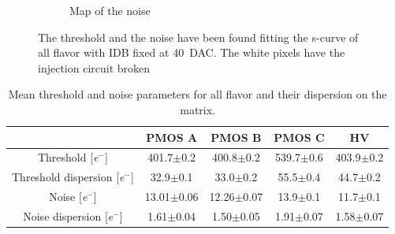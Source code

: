 \begin{figure}
\begin{subfigure}[b]{0.49\textwidth}
                \caption{Map of the noise}
                \label{fig:noise_map}
            \end{subfigure}
            \caption{The threshold and the noise have been found fitting the s-curve of all flavor with IDB fixed at \SI{40}{DAC}. The white pixels have the injection circuit broken}
               \label{fig:threshold_noise_hist}
       \end{figure}
             

        \begin{table}[h!]
            \begin{center}
            \begin{tabular}{| c |  c | c | c |c |}
            \hline
            & PMOS A & PMOS B & PMOS C & HV \\
            \hline
            \hline
            Threshold [\si{\elementarycharge}$^-$] & 401.7$\pm$0.2 & 400.8$\pm$0.2 & 539.7$\pm$0.6 &  403.9$\pm$0.2\\
            Threshold dispersion [\si{\elementarycharge}$^-$] & 32.9$\pm$0.1 & 33.0$\pm$0.2 & 55.5$\pm$0.4 & 44.7$\pm$0.2\\
            Noise [\si{\elementarycharge}$^-$] & 13.01$\pm$0.06 & 12.26$\pm$0.07 & 13.9$\pm$0.1 & 11.7$\pm$0.1\\
            Noise dispersion [\si{\elementarycharge}$^-$] & 1.61$\pm$0.04 & 1.50$\pm$0.05 & 1.91$\pm$0.07 & 1.58$\pm$0.07\\
            \hline
            \end{tabular}
            \caption{Mean threshold and noise parameters for all flavor and their dispersion on the matrix. }
            \label{tab:threshold_noise_param}
            \end{center}
        \end{table}       
        

